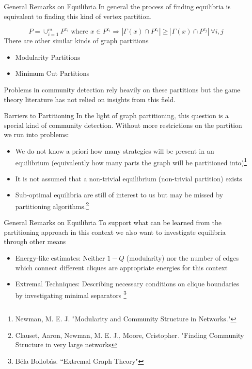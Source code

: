 \documentclass{beamer}
\begin{document}
\begin{frame}{General Remarks on Equilibria}
	In general the process of finding equilibria is equivalent to finding this kind of vertex partition.
	
	\begin{equation}
		P=\cup_{i=1}^m P^{c_i}\text{ where } x\in P^{c_i}\Rightarrow |\Gamma(x)\cap P^{c_i}|\geq |\Gamma(x)\cap P^{c_j}|\, \forall i,j 
	\end{equation}
	There are other similar kinds of graph partitions
	\begin{itemize}
		\item Modularity Partitions
		\item Minimum Cut Partitions
	\end{itemize}
	Problems in community detection rely heavily on these partitions but the game theory literature has not relied on insights from this field. 
\end{frame}

\begin{frame}{Barriers to Partitioning}
	In the light of graph partitioning, this question is a special kind of community detection. Without more restrictions on the partition we run into problems: 
	\begin{itemize}
		\item We do not know a priori how many strategies will be present in an equilibrium (equivalently how many parts the graph will be partitioned into)\footnote{Newman, M. E. J. "Modularity and Community Structure in Networks."}
		\item It is not assumed that a non-trivial equilibrium (non-trivial partition) exists
		\item Sub-optimal equilibria are still of interest to us but may be missed by partitioning algorithms.\footnote{Clauset, Aaron, Newman, M. E. J., Moore, Cristopher. "Finding Community Structure in very large networks}  
	\end{itemize}
\end{frame}

\begin{frame}{General Remarks on Equilibria}
	To support what can be learned from the partitioning approach in this context we also want to investigate equilibria through other means
	
	\begin{itemize}
		\item Energy-like estimates: Neither $1-Q$ (modularity) nor the number of edges which connect different cliques are appropriate energies for this context
		\item Extremal Techniques: Describing necessary conditions on clique boundaries by investigating minimal separators \footnote{B\'ela Bollob\'as. ``Extremal Graph Theory"}
	\end{itemize}
\end{frame}
\end{document}
